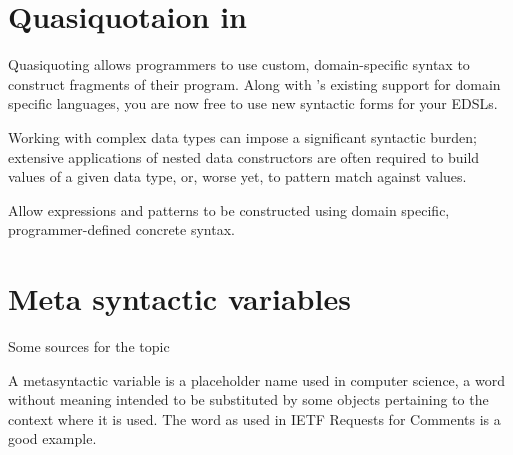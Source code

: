 \documentclass[proposal.tex]{subfiles}
\begin{document}
\section{Quasiquotaion in }
\cite{haskellquasi, mainland2007s} 

Quasiquoting allows programmers to use custom, domain-specific syntax to construct fragments of their program. Along with 
's existing support for domain specific languages, you are now free to use new syntactic forms for your EDSLs. 

Working with complex data types can impose a significant syntactic burden; extensive applications of nested data constructors are often 
required to build values of a given data type, or, worse yet, to pattern match against values.

Allow  expressions and patterns to be constructed using domain specific, programmer-defined concrete syntax.


\section{Meta syntactic variables}
Some sources for the topic 


\cite{website:metasyntacticvariableswiki}
A metasyntactic variable is a placeholder name used in computer science, a word without meaning intended to be
substituted by some objects pertaining to the context where it is used.
The word  as used in IETF Requests for Comments is a good example.
\end{document}
